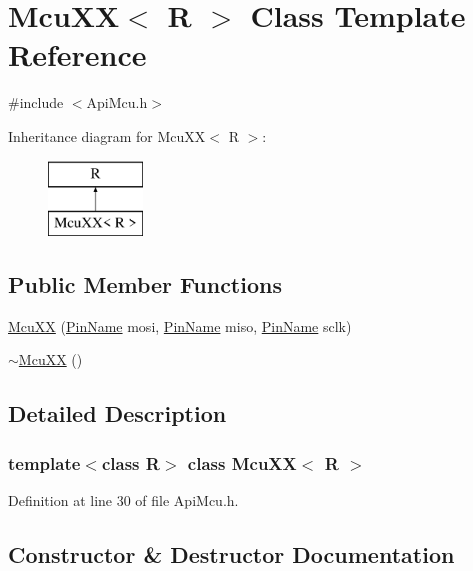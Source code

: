 \hypertarget{class_mcu_x_x}{}\section{Mcu\+XX$<$ R $>$ Class Template Reference}
\label{class_mcu_x_x}


{\ttfamily \#include $<$Api\+Mcu.\+h$>$}

Inheritance diagram for Mcu\+XX$<$ R $>$\+:\begin{figure}[H]
\begin{center}
\leavevmode
\includegraphics[height=2.000000cm]{class_mcu_x_x}
\end{center}
\end{figure}
\subsection*{Public Member Functions}
\begin{DoxyCompactItemize}
\item 
\mbox{\hyperlink{class_mcu_x_x_ae6c723c6d5e5695e08991ec9fc404064}{Mcu\+XX}} (\mbox{\hyperlink{_class_s_t_m32_l0_8h_a5ceb873075d76667eb54dc6a7d2734d1}{Pin\+Name}} mosi, \mbox{\hyperlink{_class_s_t_m32_l0_8h_a5ceb873075d76667eb54dc6a7d2734d1}{Pin\+Name}} miso, \mbox{\hyperlink{_class_s_t_m32_l0_8h_a5ceb873075d76667eb54dc6a7d2734d1}{Pin\+Name}} sclk)
\item 
\mbox{\hyperlink{class_mcu_x_x_aabd5bdc5db9e38ff12f72d196eb11b8d}{$\sim$\+Mcu\+XX}} ()
\end{DoxyCompactItemize}


\subsection{Detailed Description}
\subsubsection*{template$<$class R$>$\newline
class Mcu\+X\+X$<$ R $>$}



Definition at line 30 of file Api\+Mcu.\+h.



\subsection{Constructor \& Destructor Documentation}
\mbox{\label{class_mcu_x_x_ae6c723c6d5e5695e08991ec9fc404064}} 
